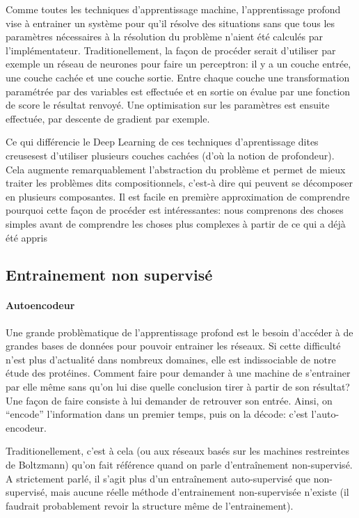 \documentclass[a4paper, journal, 11pt, onecolumn]{IEEEtran}
\begin{document}
Comme toutes les techniques d'apprentissage machine, l'apprentissage profond
vise à entrainer un système pour qu'il résolve des situations sans que tous les
paramètres nécessaires à la résolution du problème n'aient été calculés par
l'implémentateur. Traditionellement, la façon de procéder serait d'utiliser par
exemple un réseau de neurones pour faire un perceptron: il y a un couche entrée,
une couche cachée et une couche sortie. Entre chaque couche une transformation
paramétrée par des variables est effectuée et en sortie on évalue par une
fonction de score le résultat renvoyé. Une optimisation sur les paramètres est
ensuite effectuée, par descente de gradient par exemple.

Ce qui différencie le Deep Learning de ces techniques d'aprentissage dites \og
creuses\fg est d'utiliser plusieurs couches cachées (d'où la notion de
profondeur). Cela augmente remarquablement l'abstraction du problème et permet
de mieux traiter les problèmes dits compositionnels, c'est-à dire qui peuvent se
décomposer en plusieurs composantes. Il est facile en première approximation de
comprendre pourquoi cette façon de procéder est intéressantes: nous comprenons
des choses simples avant de comprendre les choses plus complexes à partir de ce
qui a déjà été appris

\subsection{Entrainement non supervisé}

\paragraph{Autoencodeur}

Une grande problèmatique de l'apprentissage profond est le besoin d'accéder à de
grandes bases de données pour pouvoir entrainer les réseaux. Si cette difficulté
n'est plus d'actualité dans nombreux domaines, elle est indissociable de notre
étude des protéines. Comment faire pour demander à une machine de s'entrainer par elle même sans
qu'on lui dise quelle conclusion tirer à partir de son résultat? Une façon de
faire consiste à lui demander de retrouver son entrée. Ainsi, on ``encode''
l'information dans un premier temps, puis on la décode: c'est l'auto-encodeur.

Traditionellement, c'est à cela (ou aux réseaux basés sur les machines
restreintes de Boltzmann) qu'on fait référence quand on parle d'entraînement
non-supervisé. A strictement parlé, il s'agit plus d'un entraînement
auto-supervisé que non-supervisé, mais aucune réelle méthode d'entrainement
non-supervisée n'existe (il faudrait probablement revoir la structure même de
l'entrainement).
\end{document}
